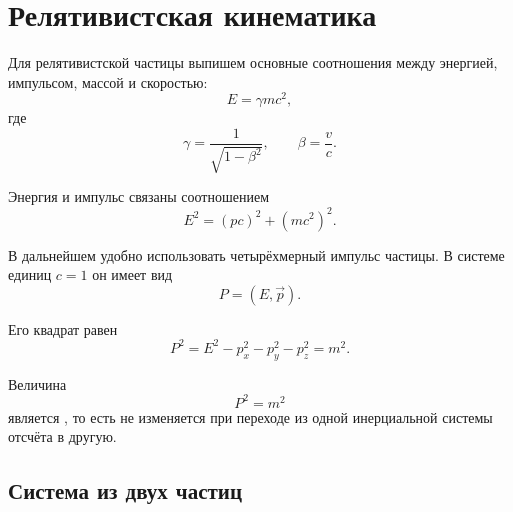 \documentclass[../final.tex]{subfiles}
\begin{document}




\section*{Релятивистская кинематика}

Для релятивистской частицы выпишем основные соотношения между
энергией, импульсом, массой и скоростью:
%
\begin{equation*}
    E=\gamma mc^2,
\end{equation*}
%
где
%
\begin{equation*}
    \gamma
    =
    \frac{1}{\sqrt{1-\beta^2}},
    \qquad
    \beta
    =
    \frac{v}{c}.
\end{equation*}

Энергия и импульс связаны соотношением
%
\begin{equation*}
    E^2
    =
    (pc)^2+(mc^2)^2.
\end{equation*}

В дальнейшем удобно использовать четырёхмерный импульс частицы.
В системе единиц $c=1$ он имеет вид
%
\begin{equation*}
    P
    =
    (E,\vec p).
\end{equation*}

Его квадрат равен
%
\begin{equation*}
    P^2
    =
    E^2-p_x^2-p_y^2-p_z^2
    =
    m^2.
\end{equation*}

Величина
%
\begin{equation*}
    P^2=m^2
\end{equation*}
%
является , то есть не изменяется
при переходе из одной инерциальной системы отсчёта в другую.



\subsection*{Система из двух частиц}
\end{document}
